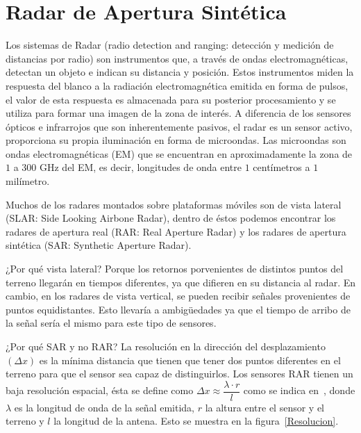 
\chapter{Radar de Apertura Sintética}
\label{Radar}

Los sistemas de Radar (radio detection and ranging: detección y medición de distancias por radio) son instrumentos que, a través de ondas electromagnéticas, detectan un objeto e indican su distancia y posición. 
Estos instrumentos miden la respuesta del blanco a la radiación electromagnética emitida en forma de pulsos, el valor de esta respuesta es almacenada para su posterior procesamiento y se utiliza para formar una imagen de la zona de interés. A diferencia de los sensores ópticos e infrarrojos que son inherentemente pasivos, el radar es un sensor activo, proporciona su propia iluminación en forma de microondas. Las microondas son ondas electromagnéticas (EM) que se encuentran en aproximadamente la zona de $1$ a $300$ GHz del EM, es decir, longitudes de onda entre $1$ centímetros a $1$ milímetro.

Muchos de los radares montados sobre plataformas móviles son de vista lateral (SLAR: Side Looking Airbone Radar), dentro de éstos podemos encontrar los radares de apertura real (RAR: Real Aperture Radar) y los radares de
apertura sintética (SAR: Synthetic Aperture Radar). 

¿Por qué vista lateral? Porque los retornos porvenientes de distintos puntos del terreno llegarán en tiempos diferentes, ya que difieren en su distancia al radar. En cambio, en los radares de vista vertical, se pueden recibir señales provenientes de puntos equidistantes. Esto llevaría a ambigüedades ya que el tiempo de arribo de la señal sería el mismo para este tipo de sensores.

¿Por qué SAR y no RAR? La resolución en la dirección del desplazamiento $(\Delta x)$ es la mínima distancia que tienen que tener dos puntos diferentes en el terreno para que el sensor sea capaz de distinguirlos. Los sensores RAR tienen un baja resolución espacial, ésta se define como  $\Delta x\approx\dfrac{\lambda \cdot r}{l}$ como se indica en~\citet{Sarmap2009}, donde $\lambda$ es la longitud de onda  de la señal emitida, $r$ la altura entre el sensor y el terreno y $l$ la longitud de la antena. Esto se muestra en la figura~\ref{Resolucion}.

